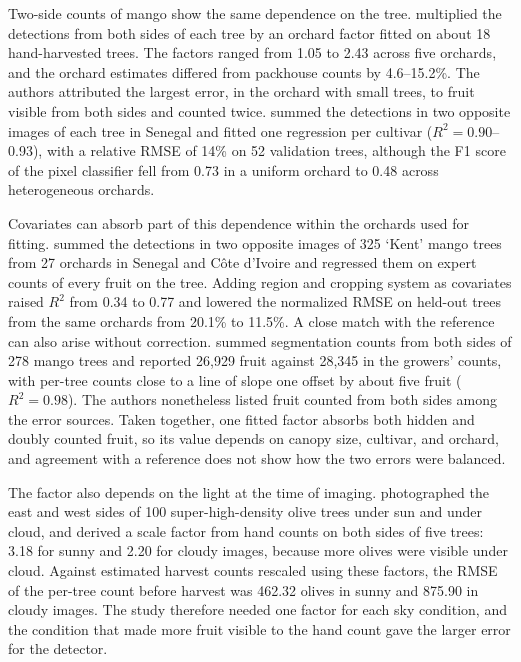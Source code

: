 Two-side counts of mango show the same dependence on the tree. \citet{koirala2019deep} multiplied the detections from both sides of each tree by an orchard factor fitted on about 18 hand-harvested trees. The factors ranged from 1.05 to 2.43 across five orchards, and the orchard estimates differed from packhouse counts by 4.6--15.2\%. The authors attributed the largest error, in the orchard with small trees, to fruit visible from both sides and counted twice. \citet{sarron2020machine} summed the detections in two opposite images of each tree in Senegal and fitted one regression per cultivar ($R^2=0.90$--0.93), with a relative RMSE of 14\% on 52 validation trees, although the F1 score of the pixel classifier fell from 0.73 in a uniform orchard to 0.48 across heterogeneous orchards.

Covariates can absorb part of this dependence within the orchards used for fitting. \citet{sarron2023fruit} summed the detections in two opposite images of 325 `Kent' mango trees from 27 orchards in Senegal and C\^ote d'Ivoire and regressed them on expert counts of every fruit on the tree. Adding region and cropping system as covariates raised $R^2$ from 0.34 to 0.77 and lowered the normalized RMSE on held-out trees from the same orchards from 20.1\% to 11.5\%. A close match with the reference can also arise without correction. \citet{maheswari2025mangoyieldnet} summed segmentation counts from both sides of 278 mango trees and reported 26,929 fruit against 28,345 in the growers' counts, with per-tree counts close to a line of slope one offset by about five fruit ($R^2=0.98$). The authors nonetheless listed fruit counted from both sides among the error sources. Taken together, one fitted factor absorbs both hidden and doubly counted fruit, so its value depends on canopy size, cultivar, and orchard, and agreement with a reference does not show how the two errors were balanced.

The factor also depends on the light at the time of imaging. \citet{denarda2024shd} photographed the east and west sides of 100 super-high-density olive trees under sun and under cloud, and derived a scale factor from hand counts on both sides of five trees: 3.18 for sunny and 2.20 for cloudy images, because more olives were visible under cloud. Against estimated harvest counts rescaled using these factors, the RMSE of the per-tree count before harvest was 462.32 olives in sunny and 875.90 in cloudy images. The study therefore needed one factor for each sky condition, and the condition that made more fruit visible to the hand count gave the larger error for the detector.

